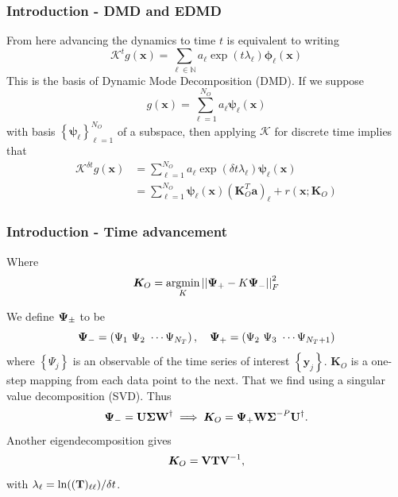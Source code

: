 \documentclass[11pt,aspectratio=169]{beamer}
\newcommand{\norm}[1]{\left|\left|#1\right|\right|}
\newcommand{\parens}[1]{\left(#1\right)}
\newcommand{\bracks}[1]{\left\{#1\right\}}
\newcommand{\N}{\mathbb{N}}
\begin{document}
    \begin{frame}
        \frametitle{Introduction - DMD and EDMD}
        From here advancing the dynamics to time $t$ is equivalent to writing
        \begin{equation}
            \mathcal{K}^{t} g(\boldsymbol{x}) = \sum_{\ell \in \N} a_\ell 
            \exp(t\lambda_\ell)\boldsymbol{\phi}_\ell (\boldsymbol{x})
        \end{equation} 
        This is the basis of Dynamic Mode Decomposition (DMD). If we suppose 
        \begin{equation}
            g(\boldsymbol{x}) = \sum_{\ell = 1}^{N_O} a_\ell \boldsymbol{\psi}_\ell
            (\boldsymbol{x}) 
        \end{equation}
        with basis $\bracks{\boldsymbol{\psi}_\ell}_{\ell=1}^{N_O}$ of a subspace, 
        then applying $\mathcal{K}$ for discrete time implies that
        \begin{align} 
            \mathcal{K}^{\delta t} g(\boldsymbol{x}) &= \sum_{\ell = 1}^{N_O} a_\ell 
            \exp(\delta t\lambda_\ell)\boldsymbol{\psi}_\ell (\boldsymbol{x}) \\
            &= \sum_{\ell = 1}^{N_O} \boldsymbol{\psi}_\ell (\boldsymbol{x})
            (\boldsymbol{K}_O^T
            \boldsymbol{a})_\ell + r(\boldsymbol{x};\boldsymbol{K}_O)
        \end{align}
    \end{frame}

    \begin{frame}
        \frametitle{Introduction - Time advancement}
        Where
        \begin{equation}
            \boldsymbol{K}_O = \underset{K}{\text{argmin}}\norm{{\bf\Psi}_+ - K{\bf\Psi}_-}_F^2
        \end{equation}

        We define ${\bf\Psi}_\pm$ to be
        \begin{equation}
            {\bf\Psi}_- = \parens{\Psi_1\ \Psi_2\ \cdots \Psi_{N_T}},\quad {\bf\Psi}_+ = \parens{
            \Psi_2\ \Psi_3\ \cdots \Psi_{N_T+1}} 
        \end{equation}
        where $\bracks{\Psi_j}$ is an observable of the time series of interest 
        $\bracks{\boldsymbol{y}_j}$. $\boldsymbol{K}_O$ is a one-step mapping from each data point
        to the next. That we find
        using a singular value decomposition (SVD). Thus
        \begin{equation}
            {\bf\Psi}_- = {\bf U\Sigma W}^{\dagger} \implies \boldsymbol{K}_O = 
            {\bf\Psi}_+{\bf W\Sigma}^{-P}{\bf U}^{\dagger}.
        \end{equation}
        Another eigendecomposition gives
        \begin{equation}
            \boldsymbol{K}_O = {\bf VTV}^{-1}, 
        \end{equation}
        with $\lambda_\ell = \ln(({\bf T})_{\ell\ell})/\delta t$.
    \end{frame}
\end{document}
